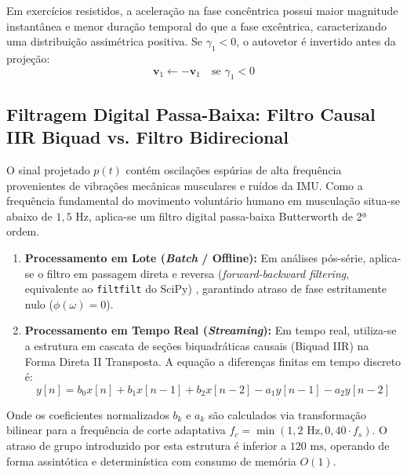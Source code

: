 \documentclass[12pt,openany,oneside,a4paper,english,brazil]{abntex2}
\begin{document}
Em exercícios resistidos, a aceleração na fase concêntrica possui maior magnitude instantânea e menor duração temporal do que a fase excêntrica, caracterizando uma distribuição assimétrica positiva. Se $\gamma_1 < 0$, o autovetor é invertido antes da projeção:
\begin{equation}
    \mathbf{v}_1 \leftarrow -\mathbf{v}_1 \quad \text{se } \gamma_1 < 0
\end{equation}

\subsection{Filtragem Digital Passa-Baixa: Filtro Causal IIR Biquad vs. Filtro Bidirecional}
O sinal projetado $p(t)$ contém oscilações espúrias de alta frequência provenientes de vibrações mecânicas musculares e ruídos da IMU. Como a frequência fundamental do movimento voluntário humano em musculação situa-se abaixo de $1{,}5\text{ Hz}$, aplica-se um filtro digital passa-baixa Butterworth de 2ª ordem.

\begin{enumerate}
    \item \textbf{Processamento em Lote (\textit{Batch} / Offline):} Em análises pós-série, aplica-se o filtro em passagem direta e reversa (\textit{forward-backward filtering}, equivalente ao \texttt{filtfilt} do SciPy) \cite{oppenheim2009}, garantindo atraso de fase estritamente nulo ($\phi(\omega) = 0$).
    \item \textbf{Processamento em Tempo Real (\textit{Streaming}):} Em tempo real, utiliza-se a estrutura em cascata de seções biquadráticas causais (Biquad IIR) na Forma Direta II Transposta. A equação a diferenças finitas em tempo discreto é:
    \begin{equation}
        y[n] = b_0 x[n] + b_1 x[n-1] + b_2 x[n-2] - a_1 y[n-1] - a_2 y[n-2]
    \end{equation}
\end{enumerate}

Onde os coeficientes normalizados $b_k$ e $a_k$ são calculados via transformação bilinear para a frequência de corte adaptativa $f_c = \min(1{,}2\text{ Hz}, 0{,}40 \cdot f_s)$. O atraso de grupo introduzido por esta estrutura é inferior a $120\text{ ms}$, operando de forma assintótica e determinística com consumo de memória $O(1)$.
\end{document}
